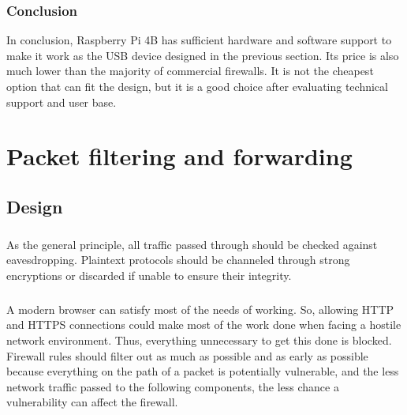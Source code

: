\documentclass[mscthesis]{usiinfthesis}
\begin{document}
\subsection{Conclusion}
In conclusion, Raspberry Pi 4B has sufficient hardware and software support to make it work as the USB device designed in the previous section. Its price is also much lower than the majority of commercial firewalls. It is not the cheapest option that can fit the design, but it is a good choice after evaluating technical support and user base.

\chapter{Packet filtering and forwarding}
\section{Design}
\paragraph{}
As the general principle, all traffic passed through should be checked against eavesdropping. Plaintext protocols should be channeled through strong encryptions or discarded if unable to ensure their integrity.
\paragraph{}
A modern browser can satisfy most of the needs of working. So, allowing HTTP and HTTPS connections could make most of the work done when facing a hostile network environment. Thus, everything unnecessary to get this done is blocked. Firewall rules should filter out as much as possible and as early as possible because everything on the path of a packet is potentially vulnerable, and the less network traffic passed to the following components, the less chance a vulnerability can affect the firewall.
\end{document}
